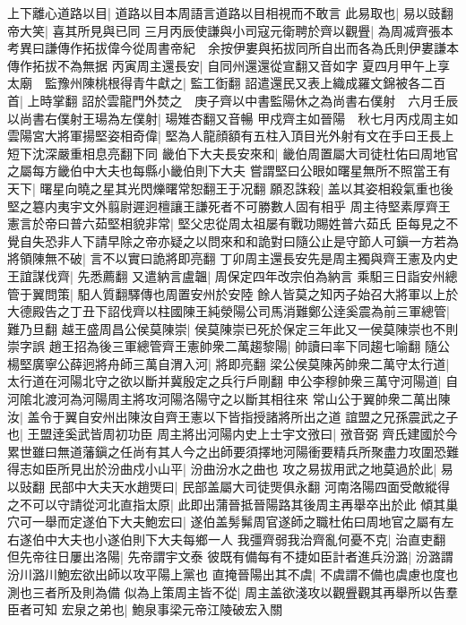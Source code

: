 上下離心道路以目|{
	道路以目本周語言道路以目相視而不敢言}
此易取也|{
	易以豉翻}
帝大笑|{
	喜其所見與已同}
三月丙辰使謙與小司寇元衛聘於齊以觀舋|{
	為周㓕齊張本　考異曰謙傳作拓拔偉今從周書帝紀　余按伊婁與拓拔同所自出而各為氏則伊婁謙本傳作拓拔不為無据}
丙寅周主還長安|{
	自同州還還從宣翻又音如字}
夏四月甲午上享太廟　監豫州陳桃根得青牛獻之|{
	監工衘翻}
詔遣還民又表上織成羅文錦被各二百首|{
	上時掌翻}
詔於雲龍門外焚之　庚子齊以中書監陽休之為尚書右僕射　六月壬辰以尚書右僕射王瑒為左僕射|{
	瑒雉杏翻又音暢}
甲戍齊主如晉陽　秋七月丙戍周主如雲陽宮大將軍揚堅姿相奇偉|{
	堅為人龍顔額有五柱入頂目光外射有文在手曰王長上短下沈深嚴重相息亮翻下同}
畿伯下大夫長安來和|{
	畿伯周置屬大司徒杜佑曰周地官之屬每方畿伯中大夫也每縣小畿伯則下大夫}
嘗謂堅曰公眼如曙星無所不照當王有天下|{
	曙星向曉之星其光閃爍曙常恕翻王于况翻}
願忍誅殺|{
	盖以其姿相殺氣重也後堅之簒内夷宇文外翦尉遲迥檀讓王謙死者不可勝數人固有相乎}
周主待堅素厚齊王憲言於帝曰普六茹堅相貌非常|{
	堅父忠從周太祖屡有戰功賜姓普六茹氏}
臣每見之不覺自失恐非人下請早除之帝亦疑之以問來和和詭對曰隨公止是守節人可鎭一方若為將領陳無不破|{
	言不以實曰詭將即亮翻}
丁卯周主還長安先是周主獨與齊王憲及内史王誼謀伐齊|{
	先悉薦翻}
又遣納言盧韞|{
	周保定四年改宗伯為納言}
乘馹三日詣安州總管于翼問策|{
	馹人質翻驛傳也周置安州於安陸}
餘人皆莫之知丙子始召大將軍以上於大德殿告之丁丑下詔伐齊以柱國陳王純滎陽公司馬消難鄭公逹奚震為前三軍總管|{
	難乃旦翻}
越王盛周昌公侯莫陳崇|{
	侯莫陳崇已死於保定三年此又一侯莫陳崇也不則崇字誤}
趙王招為後三軍總管齊王憲帥衆二萬趨黎陽|{
	帥讀曰率下同趨七喻翻}
隨公楊堅廣寧公薛迥將舟師三萬自渭入河|{
	將即亮翻}
梁公侯莫陳芮帥衆二萬守太行道|{
	太行道在河陽北守之欲以斷并冀殷定之兵行戶剛翻}
申公李穆帥衆三萬守河陽道|{
	自河隂北渡河為河陽周主將攻河陽洛陽守之以斷其相往來}
常山公于翼帥衆二萬出陳汝|{
	盖令于翼自安州出陳汝自齊王憲以下皆指授諸將所出之道}
誼盟之兄孫震武之子也|{
	王盟逹奚武皆周初功臣}
周主將出河陽内史上士宇文㢸曰|{
	㢸音弼}
齊氏建國於今累世雖曰無道藩鎭之任尚有其人今之出師要須擇地河陽衝要精兵所聚盡力攻圍恐難得志如臣所見出於汾曲戍小山平|{
	汾曲汾水之曲也}
攻之易拔用武之地莫過於此|{
	易以䜴翻}
民部中大夫天水趙煚曰|{
	民部盖屬大司徒煚俱永翻}
河南洛陽四面受敵縱得之不可以守請從河北直指太原|{
	此即出蒲晉抵晉陽路其後周主再舉卒出於此}
傾其巢穴可一舉而定遂伯下大夫鮑宏曰|{
	遂伯盖髣髴周官遂師之職杜佑曰周地官之屬有左右遂伯中大夫也小遂伯則下大夫每鄉一人}
我彊齊弱我治齊亂何憂不克|{
	治直吏翻}
但先帝往日屢出洛陽|{
	先帝謂宇文泰}
彼既有備每有不捷如臣計者進兵汾潞|{
	汾潞謂汾川潞川鮑宏欲出師以攻平陽上黨也}
直掩晉陽出其不虞|{
	不虞謂不備也虞慮也度也測也三者所及則為備}
似為上策周主皆不從|{
	周主盖欲淺攻以觀舋觀其再舉所以告羣臣者可知}
宏泉之弟也|{
	鮑泉事梁元帝江陵破宏入關}
